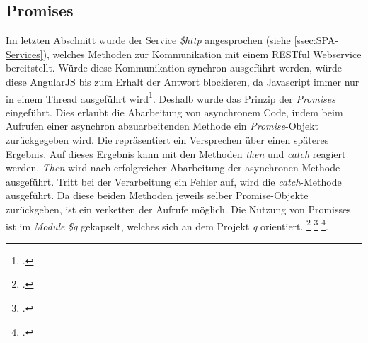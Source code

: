 \subsection{Promises}
\label{ssec:SPA-Promises}
Im letzten Abschnitt wurde der Service \textit{\$http} angesprochen (siehe \ref{ssec:SPA-Services}), welches Methoden zur Kommunikation mit einem RESTful Webservice bereitstellt. Würde diese Kommunikation synchron ausgeführt werden, würde diese AngularJS bis zum Erhalt der Antwort blockieren, da Javascript immer nur in einem Thread ausgeführt wird\footcite{online:javascript:single-threaded}. Deshalb wurde das Prinzip der \textit{Promises} eingeführt. Dies erlaubt die Abarbeitung von asynchronem Code, indem beim Aufrufen einer asynchron abzuarbeitenden Methode ein \textit{Promise}-Objekt zurückgegeben wird. Die repräsentiert ein Versprechen über einen späteres Ergebnis. Auf dieses Ergebnis kann mit den Methoden \textit{then} und \textit{catch} reagiert werden. \textit{Then} wird nach erfolgreicher Abarbeitung der asynchronen Methode ausgeführt. Tritt bei der Verarbeitung ein Fehler auf, wird die \textit{catch}-Methode ausgeführt. Da diese beiden Methoden jeweils selber Promise-Objekte zurückgeben, ist ein verketten der Aufrufe möglich. 
Die Nutzung von Promisses ist im \textit{Module} \textit{\$q} gekapselt, welches sich an dem Projekt \textit{q} orientiert. 
\footcite{online:angular:module:q} 
\footcite{online:doc_q} 
\footcite[S. 211ff]{book:AngularJs:Steyer2015}.
